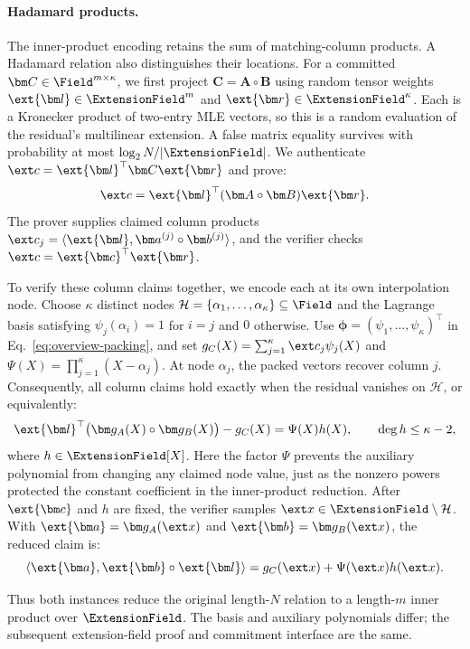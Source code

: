 \paragraph{Hadamard products.}
The inner-product encoding retains the sum of matching-column
products. A Hadamard relation also distinguishes their locations.
For a committed \(\bm C\in\Field^{m\times\kappa}\), we first project
\(\bm C=\bm A\circ\bm B\) using random tensor weights
\(\ext{\bm l}\in\ExtensionField^m\) and
\(\ext{\bm r}\in\ExtensionField^\kappa\).
Each is a Kronecker product of two-entry MLE vectors, so this is a
random evaluation of the residual's multilinear extension.
A false matrix equality survives with probability at most
\(\log_2N/|\ExtensionField|\).
We authenticate \(\ext c=\ext{\bm l}^{\top}\bm C\ext{\bm r}\) and prove:
\[
    \ext c=\ext{\bm l}^{\top}(\bm A\circ\bm B)\ext{\bm r}.
\]
The prover supplies claimed column products
\(\ext c_j=\langle\ext{\bm l},
\bm a^{(j)}\circ\bm b^{(j)}\rangle\), and the verifier checks
\(\ext c=\ext{\bm c}^{\top}\ext{\bm r}\).

To verify these column claims together, we encode each at its own
interpolation node. Choose \(\kappa\) distinct nodes
\(\mathcal H=\{\alpha_1,\ldots,\alpha_\kappa\}\subseteq\Field\)
and the Lagrange basis satisfying
\(\psi_j(\alpha_i)=1\) for \(i=j\) and \(0\) otherwise.
Use \(\bm\phi=(\psi_1,\ldots,\psi_\kappa)^\top\) in
Eq.~\eqref{eq:overview-packing}, and set
\(g_C(X)=\sum_{j=1}^{\kappa}\ext c_j\psi_j(X)\) and
\(\Psi(X)=\prod_{j=1}^{\kappa}(X-\alpha_j)\).
At node \(\alpha_j\), the packed vectors recover column \(j\).
Consequently, all column claims hold exactly when the residual
vanishes on \(\mathcal H\), or equivalently:
\begin{equation*}
    \ext{\bm l}^{\top}
      \bigl(\bm g_A(X)\circ\bm g_B(X)\bigr)-g_C(X)
    =\Psi(X)h(X),
    \qquad \deg h\leq\kappa-2,
\end{equation*}
where \(h\in\ExtensionField[X]\).
Here the factor \(\Psi\) prevents the auxiliary polynomial from
changing any claimed node value, just as the nonzero powers protected
the constant coefficient in the inner-product reduction.
After \(\ext{\bm c}\) and \(h\) are fixed, the verifier samples
\(\ext x\in\ExtensionField\setminus\mathcal H\).
With \(\ext{\bm a}=\bm g_A(\ext x)\) and
\(\ext{\bm b}=\bm g_B(\ext x)\), the reduced claim is:
\[
    \langle\ext{\bm a},\ext{\bm b}\circ\ext{\bm l}\rangle
    =g_C(\ext x)+\Psi(\ext x)h(\ext x).
\]

Thus both instances reduce the original length-\(N\) relation to a
length-\(m\) inner product over \(\ExtensionField\). The basis and
auxiliary polynomials differ; the subsequent extension-field proof
and commitment interface are the same.

